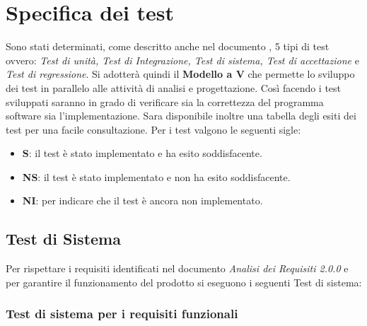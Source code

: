 \section{Specifica dei test}

Sono stati determinati, come descritto anche nel documento \NdP , 5 tipi di test ovvero: 
\textit{Test di unità, Test di Integrazione, Test di sistema, Test di accettazione} e \textit{Test di regressione}. 
Si adotterà quindi il \textbf{Modello a V} che permette lo sviluppo dei test in parallelo alle attività di analisi e progettazione. 
Così facendo i test sviluppati saranno in grado di verificare sia la correttezza del programma software sia l'implementazione. 
Sara disponibile inoltre una tabella degli esiti dei test per una facile consultazione.
Per i test valgono le seguenti sigle:

    \begin{itemize}
        \item \textbf{S}: il test è stato implementato e ha esito soddisfacente.
        \item \textbf{NS}: il test è stato implementato e non ha esito soddisfacente.
        \item \textbf{NI}: per indicare che il test è ancora non implementato.
    \end{itemize}
 
\subsection{Test di Sistema}

    Per rispettare i requisiti identificati nel documento \textit{Analisi dei Requisiti 2.0.0} e per garantire il funzionamento del prodotto si eseguono i seguenti Test di sistema:\\
    
\subsubsection{Test di sistema per i requisiti funzionali}
    \hphantom{}

